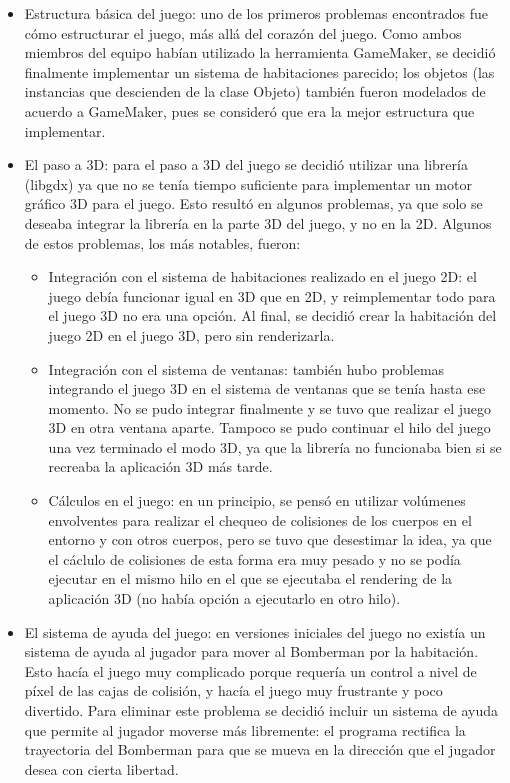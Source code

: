 \documentclass[a4paper]{article}
\begin{document}
\begin{itemize}

\item Estructura básica del juego: uno de los primeros problemas encontrados fue cómo estructurar el juego, más allá del corazón del juego. Como ambos miembros del equipo habían utilizado la herramienta GameMaker, se decidió finalmente implementar un sistema de habitaciones parecido; los objetos (las instancias que descienden de la clase Objeto) también fueron modelados de acuerdo a GameMaker, pues se consideró que era la mejor estructura que implementar.

\item El paso a 3D: para el paso a 3D del juego se decidió utilizar una librería (libgdx) ya que no se tenía tiempo suficiente para implementar un motor gráfico 3D para el juego. Esto resultó en algunos problemas, ya que solo se deseaba integrar la librería en la parte 3D del juego, y no en la 2D. Algunos de estos problemas, los más notables, fueron:

	\begin{itemize}
	\item Integración con el sistema de habitaciones realizado en el juego 2D: el juego debía funcionar igual en 3D que en 2D, y reimplementar todo para el juego 3D no era una opción. Al final, se decidió crear la habitación del juego 2D en el juego 3D, pero sin renderizarla.
	
	\item Integración con el sistema de ventanas: también hubo problemas integrando el juego 3D en el sistema de ventanas que se tenía hasta ese momento. No se pudo integrar finalmente y se tuvo que realizar el juego 3D en otra ventana aparte. Tampoco se pudo continuar el hilo del juego una vez terminado el modo 3D, ya que la librería no funcionaba bien si se recreaba la aplicación 3D más tarde.
	
	\item Cálculos en el juego: en un principio, se pensó en utilizar volúmenes envolventes para realizar el chequeo de colisiones de los cuerpos en el entorno y con otros cuerpos, pero se tuvo que desestimar la idea, ya que el cáclulo de colisiones de esta forma era muy pesado y no se podía ejecutar en el mismo hilo en el que se ejecutaba el rendering de la aplicación 3D (no había opción a ejecutarlo en otro hilo).
	\end{itemize}
	
\item El sistema de ayuda del juego: en versiones iniciales del juego no existía un sistema de ayuda al jugador para mover al Bomberman por la habitación. Esto hacía el juego muy complicado porque requería un control a nivel de píxel de las cajas de colisión, y hacía el juego muy frustrante y poco divertido. Para eliminar este problema se decidió incluir un sistema de ayuda que permite al jugador moverse más libremente: el programa rectifica la trayectoria del Bomberman para que se mueva en la dirección que el jugador desea con cierta libertad.


\end{itemize}
\end{document}
